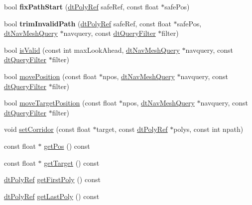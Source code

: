 \begin{DoxyCompactItemize}
\item 
\mbox{\label{classdtPathCorridor_ae2e11d477d193c79197fa28acae824b8}} 
bool {\bfseries fix\+Path\+Start} (\hyperlink{group__detour_gab4e0b2257a670c1a800057999612b466}{dt\+Poly\+Ref} safe\+Ref, const float $\ast$safe\+Pos)
\item 
\mbox{\label{classdtPathCorridor_a5ed6daf1e663f2b0a854794e431514c8}} 
bool {\bfseries trim\+Invalid\+Path} (\hyperlink{group__detour_gab4e0b2257a670c1a800057999612b466}{dt\+Poly\+Ref} safe\+Ref, const float $\ast$safe\+Pos, \hyperlink{classdtNavMeshQuery}{dt\+Nav\+Mesh\+Query} $\ast$navquery, const \hyperlink{classdtQueryFilter}{dt\+Query\+Filter} $\ast$filter)
\item 
bool \hyperlink{classdtPathCorridor_aeb23d3697b0e17837b06b13ae5be4e52}{is\+Valid} (const int max\+Look\+Ahead, \hyperlink{classdtNavMeshQuery}{dt\+Nav\+Mesh\+Query} $\ast$navquery, const \hyperlink{classdtQueryFilter}{dt\+Query\+Filter} $\ast$filter)
\item 
bool \hyperlink{classdtPathCorridor_a320a804c422fdb9b58f677b9b42ebf22}{move\+Position} (const float $\ast$npos, \hyperlink{classdtNavMeshQuery}{dt\+Nav\+Mesh\+Query} $\ast$navquery, const \hyperlink{classdtQueryFilter}{dt\+Query\+Filter} $\ast$filter)
\item 
bool \hyperlink{classdtPathCorridor_a66f8097a4f49c077b6c6da5c727c6877}{move\+Target\+Position} (const float $\ast$npos, \hyperlink{classdtNavMeshQuery}{dt\+Nav\+Mesh\+Query} $\ast$navquery, const \hyperlink{classdtQueryFilter}{dt\+Query\+Filter} $\ast$filter)
\item 
void \hyperlink{classdtPathCorridor_af26a1205a7e38f0389a2dcb2dc23ca9b}{set\+Corridor} (const float $\ast$target, const \hyperlink{group__detour_gab4e0b2257a670c1a800057999612b466}{dt\+Poly\+Ref} $\ast$polys, const int npath)
\item 
const float $\ast$ \hyperlink{classdtPathCorridor_a607e96864c9cb68386d57e90d8681159}{get\+Pos} () const
\item 
const float $\ast$ \hyperlink{classdtPathCorridor_aa1ea66fedbbab0cabfb279287aee392b}{get\+Target} () const
\item 
\hyperlink{group__detour_gab4e0b2257a670c1a800057999612b466}{dt\+Poly\+Ref} \hyperlink{classdtPathCorridor_a1328df3808790d4bedec54112b0fab43}{get\+First\+Poly} () const
\item 
\hyperlink{group__detour_gab4e0b2257a670c1a800057999612b466}{dt\+Poly\+Ref} \hyperlink{classdtPathCorridor_a4d23baaf31661832ea81fd5a6fcc0a59}{get\+Last\+Poly} () const

\end{DoxyCompactItemize}
